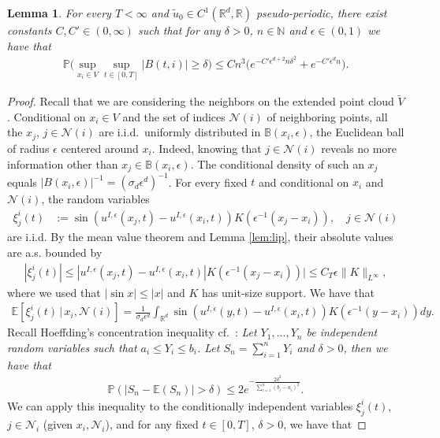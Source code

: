 \documentclass[a4paper,11pt]{amsart}
\newtheorem{lemma}[theorem]{Lemma}
\newcommand{\red}[1]{{#1}}
\newcommand{\B}{\mathbb{B}}
\newcommand{\E}{\mathbb{E}}
\newcommand{\N}{\mathbb{N}}
\renewcommand{\P}{\mathbb{P}}
\newcommand{\R}{\mathbb{R}}
\newcommand{\ep}{\epsilon}
\newcommand{\cN}{\mathcal{N}}
\numberwithin{equation}{section}
\numberwithin{theorem}{section}
\theoremstyle{definition}
\begin{document}
\begin{lemma}\label{lem:tail-bd}
For every $T<\infty$ and \red{$\tilde u_0\in C^1(\R^d,\R)$ pseudo-periodic}, there exist constants $C, C'\in(0,\infty)$ such that for any $\delta>0$, $n\in\N$ and $\ep\in(0,1)$ we have that 
\begin{align*}
\P\Big(\sup_{x_i\in V}\sup_{t\in[0,T]}|B(t,i)|\ge\delta\Big)\le Cn^{3}\big(e^{-C'\ep^{d+2} n \delta^2}+e^{-C'\ep^dn}\big).
\end{align*}
\end{lemma}

\begin{proof}
\red{Recall that we are considering the neighbors on the extended point cloud $\tilde V$.}
Conditional on $x_i\in V$ and the set of indices $\cN(i)$ of neighboring points, all the $x_j$, $j\in\cN(i)$ are i.i.d.~uniformly distributed in $\B(x_i,\ep)$, the Euclidean ball of radius $\ep$ centered around $x_i$. Indeed, knowing that $j\in\cN(i)$ reveals no more information other than $x_j\in \B(x_i,\ep)$. The conditional density of such an $x_j$ equals $|B(x_i,\ep)|^{-1}=(\sigma_d\ep^d)^{-1}$.
For every fixed $t$ and conditional on $x_i$ and $\cN(i)$, the random variables
\begin{align}\label{def-xi}
\xi_j^i(t)&:=\sin\left(u^{I,\ep}(x_j,t)-u^{I,\ep}(x_i,t)\right)K\left(\ep^{-1}(x_j-x_i)\right), \quad j\in\cN(i) 
\end{align}
are i.i.d. By the mean value theorem and Lemma \ref{lem:lip}, their absolute values are a.s. bounded by
\begin{align}\label{xi}
|\xi_j^i(t)|\le |u^{I,\ep}(x_j,t)-u^{I,\ep}(x_i,t)|K\left(\ep^{-1}(x_j-x_i)\right)|\le C_T\ep\|K\|_{L^\infty},
\end{align}
where we used that $|\sin x|\le |x|$ and $K$ has unit-size support. We have that
\begin{align*}
\E\left[\xi_j^i(t)\, |\, x_i, \cN(i)\right] =\frac{1}{\sigma_d\ep^d}\int_{\R^d} \sin\left(u^{I,\ep}(y,t)-u^{I,\ep}(x_i,t)\right)K\left(\ep^{-1}(y-x_i)\right) dy.
\end{align*}
Recall Hoeffding's concentration inequality cf.~\cite[Theorem 2.8]{boucheron}: {\it{Let $Y_1,...,Y_n$ be independent random variables such that $a_i\le Y_i\le b_i$. Let $S_n=\sum_{i=1}^nY_i$ and $\delta>0$, then we have that
\begin{align*}
\P\left(|S_n-\E(S_n)|>\delta\right)\le 2e^{-\frac{2\delta^2}{\sum_{i=1}^n(b_i-a_i)^2}}.
\end{align*}}}
We can apply this inequality to the conditionally independent variables $\xi_j^i(t)$, $j\in\cN_i$ (given $x_i, \cN_i$), and for any fixed $t\in[0,T]$, $\delta>0$, we have that


\end{proof}
\end{document}
